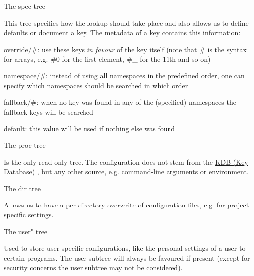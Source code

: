 \begin{DoxyItemize}
\item The {\ttfamily spec} tree\par
 This tree specifies how the lookup should take place and also allows us to define defaults or document a key. The metadata of a key contains this information\-:
\begin{DoxyItemize}
\item {\ttfamily override/\#}\-: use these keys {\itshape in favour} of the key itself (note that {\ttfamily \#} is the syntax for arrays, e.\-g. {\ttfamily \#0} for the first element, {\ttfamily \#\-\_} for the 11th and so on)
\item {\ttfamily namespace/\#}\-: instead of using all namespaces in the predefined order, one can specify which namespaces should be searched in which order
\item {\ttfamily fallback/\#}\-: when no key was found in any of the (specified) namespaces the {\ttfamily fallback}-\/keys will be searched
\item {\ttfamily default}\-: this value will be used if nothing else was found
\end{DoxyItemize}
\end{DoxyItemize}


\begin{DoxyItemize}
\item The {\ttfamily proc} tree\par
 Is the only read-\/only tree. The configuration does not stem from the \hyperlink{group__kdb}{K\-D\-B (Key Database) }, but any other source, e.\-g. command-\/line arguments or environment.
\end{DoxyItemize}


\begin{DoxyItemize}
\item The {\ttfamily dir} tree\par
 Allows us to have a per-\/directory overwrite of configuration files, e.\-g. for project specific settings.
\end{DoxyItemize}


\begin{DoxyItemize}
\item The {\ttfamily user"} tree \par
 Used to store user-\/specific configurations, like the personal settings of a user to certain programs. The user subtree will always be favoured if present (except for security concerns the user subtree may not be considered).
\end{DoxyItemize}


